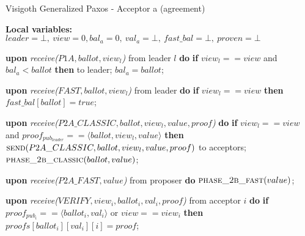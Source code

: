 \begin{algorithm} 
	\caption{Visigoth Generalized Paxos - Acceptor a (agreement)}
	\label{VFT-Acc}
	\textbf{Local variables:} $leader = \bot,\ view = 0, bal_a = 0,\ val_a = \bot,\ fast\_bal = \bot,\ proven = \bot$
	\begin{algorithmic}[1]
		\State \textbf{upon} \textit{receive($P1A, ballot, view_l$)} from leader $l$ \textbf{do}
		\State \hspace{\algorithmicindent} \textbf{if} $view_l == view$ and $bal_a < ballot$ \textbf{then}
		\State \hspace{\algorithmicindent}\hspace{\algorithmicindent}  to leader;
		\State \hspace{\algorithmicindent}\hspace{\algorithmicindent} $bal_a = ballot$;
		
		\State
		\State \textbf{upon} \textit{receive($FAST,ballot,view_l$)} from leader \textbf{do}
		\State \hspace{\algorithmicindent} \textbf{if} $view_l == view$ \textbf{then}
		\State \hspace{\algorithmicindent}\hspace{\algorithmicindent} $fast\_bal[ballot] = true$;
		
		\State
		\State \textbf{upon} \textit{receive($P2A\_CLASSIC, ballot, view_l, value, proof$)}  \textbf{do}
		\State \hspace{\algorithmicindent} \textbf{if} $view_l == view$ and $proof_{pub_{leader}} == \langle ballot, view_l, value \rangle$ \textbf{then}
		\State \hspace{\algorithmicindent}\hspace{\algorithmicindent} $\Call{send}{P2A\_CLASSIC, ballot, view_l, value, proof}$ to acceptors;
		\State \hspace{\algorithmicindent}\hspace{\algorithmicindent} $\Call{phase\_2b\_classic}{ballot, value}$; 
		
		\State		
		\State \textbf{upon} \textit{receive($P2A\_FAST, value$)} from proposer \textbf{do}
		\State \hspace{\algorithmicindent} $\Call{phase\_2b\_fast}{value}$;
		
		\State
		\State \textbf{upon} \textit{receive($VERIFY,view_i, ballot_i,val_i,proof$)} from acceptor $i$ \textbf{do}
		\State \hspace{\algorithmicindent} \textbf{if} $proof_{pub_i} == \langle ballot_i, val_i \rangle$ or $view == view_i$ \textbf{then}
		\State \hspace{\algorithmicindent}\hspace{\algorithmicindent} $proofs[ballot_i][val_i][i] = proof$;
		

\end{algorithmic}
\end{algorithm}
